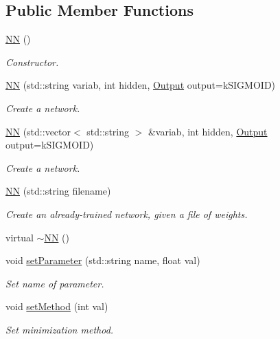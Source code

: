 \subsection*{Public Member Functions}
\begin{CompactItemize}
\item 
\hyperlink{classjetnet_1_1NN_a0}{NN} ()
\begin{CompactList}\small\item\em Constructor. \item\end{CompactList}\item 
\hyperlink{classjetnet_1_1NN_a1}{NN} (std::string variab, int hidden, \hyperlink{classjetnet_1_1NN_w18}{Output} output=k\-SIGMOID)
\begin{CompactList}\small\item\em Create a network. \item\end{CompactList}\item 
\hyperlink{classjetnet_1_1NN_a2}{NN} (std::vector$<$ std::string $>$ \&variab, int hidden, \hyperlink{classjetnet_1_1NN_w18}{Output} output=k\-SIGMOID)
\begin{CompactList}\small\item\em Create a network. \item\end{CompactList}\item 
\hyperlink{classjetnet_1_1NN_a3}{NN} (std::string filename)
\begin{CompactList}\small\item\em Create an already-trained network, given a file of weights. \item\end{CompactList}\item 
virtual \hyperlink{classjetnet_1_1NN_a4}{$\sim$NN} ()
\item 
void \hyperlink{classjetnet_1_1NN_a5}{set\-Parameter} (std::string name, float val)
\begin{CompactList}\small\item\em Set name of parameter. \item\end{CompactList}\item 
void \hyperlink{classjetnet_1_1NN_a6}{set\-Method} (int val)
\begin{CompactList}\small\item\em Set minimization method. \item\end{CompactList}\item 

\end{CompactItemize}
